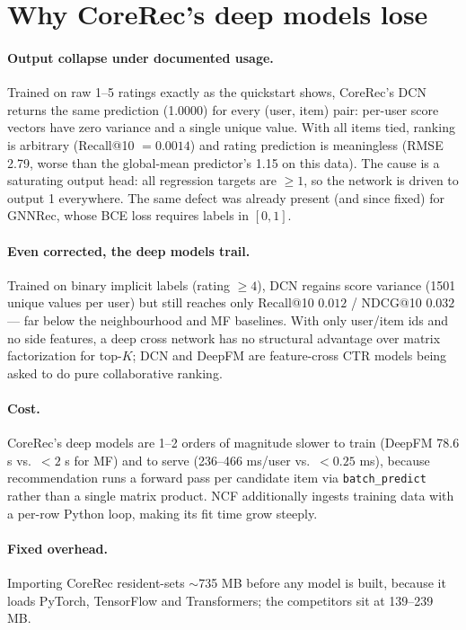 \documentclass[10pt]{article}
\begin{document}
\section{Why CoreRec's deep models lose}
\label{sec:collapse}
\paragraph{Output collapse under documented usage.} Trained on raw 1--5 ratings
exactly as the quickstart shows, CoreRec's DCN returns the same prediction
(1.0000) for every (user, item) pair: per-user score vectors have zero variance
and a single unique value. With all items tied, ranking is arbitrary (Recall@10
$=0.0014$) and rating prediction is meaningless (RMSE 2.79, worse than the
global-mean predictor's 1.15 on this data). The cause is a saturating output
head: all regression targets are $\geq 1$, so the network is driven to output 1
everywhere. The same defect was already present (and since fixed) for GNNRec,
whose BCE loss requires labels in $[0,1]$.

\paragraph{Even corrected, the deep models trail.} Trained on binary implicit
labels (rating $\geq 4$), DCN regains score variance (1501 unique values per
user) but still reaches only Recall@10 $0.012$ / NDCG@10 $0.032$ --- far below
the neighbourhood and MF baselines. With only user/item ids and no side features,
a deep cross network has no structural advantage over matrix factorization for
top-$K$; DCN and DeepFM are feature-cross CTR models being asked to do pure
collaborative ranking.

\paragraph{Cost.} CoreRec's deep models are 1--2 orders of magnitude slower to
train (DeepFM 78.6 s vs.\ $<2$ s for MF) and to serve (236--466 ms/user vs.\
$<0.25$ ms), because recommendation runs a forward pass per candidate item via
\texttt{batch\_predict} rather than a single matrix product. NCF additionally
ingests training data with a per-row Python loop, making its fit time grow
steeply.

\paragraph{Fixed overhead.} Importing CoreRec resident-sets $\sim$735 MB before
any model is built, because it loads PyTorch, TensorFlow and Transformers; the
competitors sit at 139--239 MB.
\end{document}
